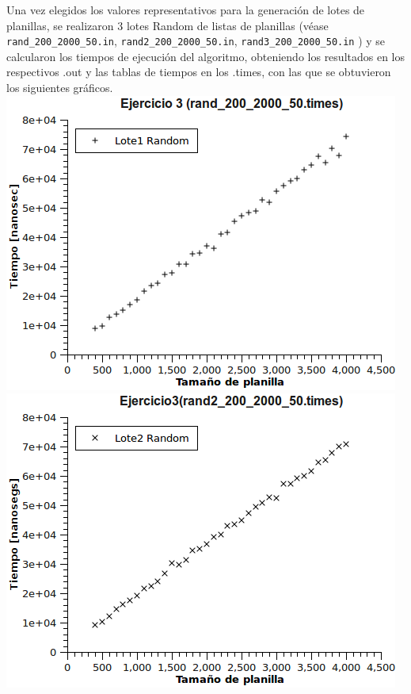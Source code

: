 Una vez elegidos los valores representativos para la generación de lotes de planillas, se realizaron 3 lotes Random de listas de planillas (véase \texttt{rand\_200\_2000\_50.in}, \texttt{rand2\_200\_2000\_50.in}, \texttt{rand3\_200\_2000\_50.in} ) y se calcularon los tiempos de ejecución del algoritmo, obteniendo los resultados en los respectivos .out y las tablas de tiempos en los .times, con las que se obtuvieron los siguientes gráficos.
\newline
\newline
\includegraphics[scale=0.8]{img/ej3/Graph1.png}
\newline
\includegraphics[scale=0.8]{img/ej3/Graph2.png}
\newline
